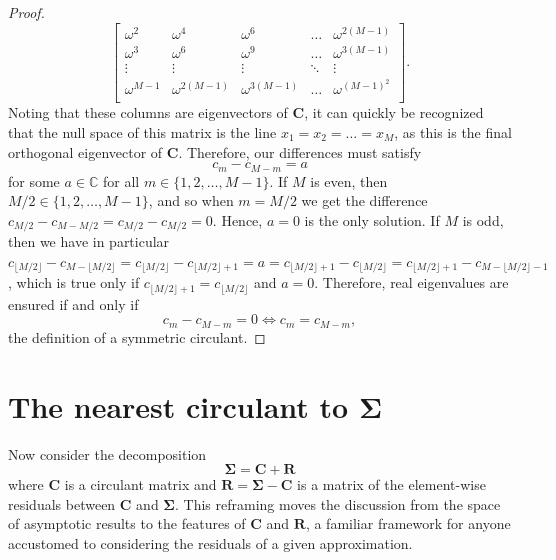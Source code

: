 \documentclass[letterpaper,12pt,oneside,final]{article}
\newcommand{\m}[1]{\mathbf{#1}}               %
\newcommand{\sm}[1]{\boldsymbol{#1}}   %
\newcommand{\field}[1]{\mathbb{#1}}
\newcommand{\Complex}{\field{C}}
\begin{document}
\begin{proof}
$$\begin{bmatrix}
  \omega^2 & \omega^4 & \omega^6 & \dots & \omega^{2(M-1)} \\
  \omega^3 & \omega^6 & \omega^9 & \dots & \omega^{3(M-1)} \\
  \vdots & \vdots & \vdots & \ddots & \vdots \\
  \omega^{M-1} & \omega^{2(M-1)} & \omega^{3(M-1)} & \dots & \omega^{(M-1)^2} \\
  \end{bmatrix}.$$
  Noting that these columns are eigenvectors of $\m{C}$, it can quickly be recognized that the null space of this matrix is the line $x_1 = x_2 = \dots = x_M$, as this is the final orthogonal eigenvector of $\m{C}$. Therefore, our differences must satisfy
  $$c_m - c_{M-m} = a$$
  for some $a \in \Complex$ for all $m \in \{1, 2, \dots, M-1\}$. If $M$ is even, then $M/2 \in \{1, 2, \dots, M-1\}$, and so when $m = M/2$ we get the difference $c_{M/2} - c_{M - M/2} = c_{M/2} - c_{M/2} = 0$. Hence, $a = 0$ is the only solution. If $M$ is odd, then we have in particular $c_{\lfloor M/2 \rfloor} - c_{M - \lfloor M/2 \rfloor} = c_{\lfloor M/2 \rfloor} - c_{\lfloor M/2 \rfloor + 1} = a = c_{\lfloor M/2 \rfloor + 1} - c_{\lfloor M/2 \rfloor} = c_{\lfloor M/2 \rfloor + 1} - c_{M - \lfloor M/2 \rfloor - 1}$, which is true only if $c_{\lfloor M/2 \rfloor + 1} = c_{\lfloor M/2 \rfloor}$ and $a = 0$. Therefore, real eigenvalues are ensured if and only if
  $$c_m - c_{M-m} = 0 \iff c_m = c_{M-m},$$
  the definition of a symmetric circulant.
\end{proof}

\section{The nearest circulant to $\m{\Sigma}$} \label{c:multipleTesting:nearestCirc}

Now consider the decomposition
\begin{equation} \label{eq:circDecomp}
  \sm{\Sigma} = \m{C} + \m{R}
\end{equation}
where $\m{C}$ is a circulant matrix and $\m{R} = \sm{\Sigma} - \m{C}$ is a matrix of the element-wise residuals between $\m{C}$ and $\sm{\Sigma}$. This reframing moves the discussion from the space of asymptotic results to the features of $\m{C}$ and $\m{R}$, a familiar framework for anyone accustomed to considering the residuals of a given approximation.
\end{document}
